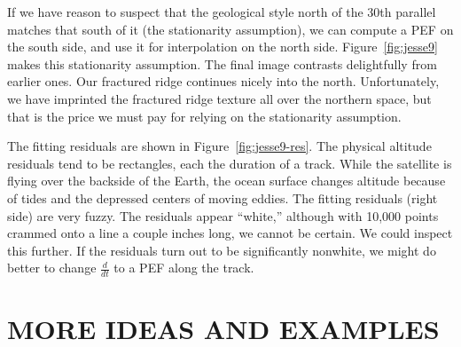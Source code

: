 \par
If we have reason to suspect that the geological style north of
the 30th parallel matches that south of it
(the stationarity assumption),
we can compute a PEF on the south side,
and use it for interpolation on the north side.
Figure~\ref{fig:jesse9} makes this stationarity assumption.
The final image contrasts delightfully from earlier ones.
Our fractured ridge continues nicely into the north.
Unfortunately, we have imprinted the fractured ridge
texture all over the northern space,
but that is the price we must pay for relying on the stationarity assumption.
\par
The fitting residuals
are shown in Figure~\ref{fig:jesse9-res}.
The physical altitude residuals tend to be rectangles,
each the duration of a track.
While the satellite is flying over the backside of the Earth,
the ocean surface changes altitude because of tides and the depressed centers of moving eddies.
The fitting residuals (right side) are very fuzzy.
The residuals appear ``white,'' although with 10,000 points
crammed onto a line a couple inches long, we cannot be certain.
We could inspect this further.
If the residuals turn out to be significantly nonwhite,
we might do better to change $\frac{d}{ dt}$ to a PEF along the track.


\section{MORE IDEAS AND EXAMPLES}

